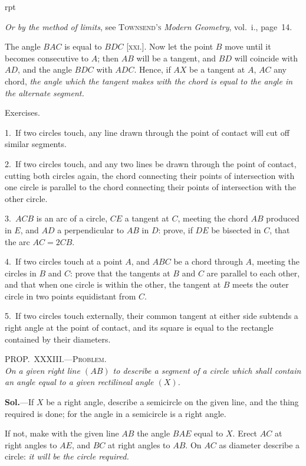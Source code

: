 \documentclass[oneside]{book}
\newcommand\myprop[2]{
\bigskip\Needspace*{4\baselineskip}\begin{center}\textsc{#1}\\\medskip\emph{#2}\par\end{center}
}
\newcommand\exhead[1]{
\Needspace*{5\baselineskip}\begin{center}
\textsf{#1}
\end{center}
}
\newcommand\imgflow[3]{
\setcounter{wrapwidth}{#1}
\begin{wrapfigure}[#2]{r}{\value{wrapwidth}pt}
\begin{center}
\vspace{-0.3in}
\end{center}
\end{wrapfigure}
}
\newcommand\imgcent[2]{
\begin{center}
\end{center}
}
\begin{document}
\imgflow{120}{9}{f140}

\textit{Or by the method of limits}, see \textsc{Townsend's} \emph{Modern
Geometry}, vol.~i., page~14.

The angle $BAC$ is equal to
$BDC$ [\textsc{xxi.}]. Now let the point
$B$ move until it becomes consecutive
to $A$; then $AB$ will be
a tangent, and $BD$ will coincide
with $AD$, and the angle $BDC$
with $ADC$. Hence, if $AX$ be
a tangent at $A$, $AC$ any chord,
\emph{the angle which the tangent makes with the chord is equal
to the angle in the alternate segment.}

\exhead{Exercises.}

\begin{footnotesize}
1.~If two circles touch, any line drawn through the point of
contact will cut off similar segments.

2.~If two circles touch, and any two lines be drawn through the
point of contact, cutting both circles again, the chord connecting
their points of intersection with one circle is parallel to the chord
connecting their points of intersection with the other circle.

3.~$ACB$ is an arc of a circle, $CE$ a tangent at $C$, meeting the
chord $AB$ produced in $E$, and $AD$ a perpendicular to $AB$ in $D$:
prove, if $DE$ be bisected in $C$, that the arc $AC = 2CB$.

4.~If two circles touch at a point $A$, and $ABC$ be a chord
through $A$, meeting the circles in $B$ and $C$: prove that the tangents
at $B$ and $C$ are parallel to each other, and that when one
circle is within the other, the tangent at $B$ meets the outer circle
in two points equidistant from $C$.

5.~If two circles touch externally, their common tangent at
either side subtends a right angle at the point of contact, and its
square is equal to the rectangle contained by their diameters.
\par\end{footnotesize}

\myprop{PROP\@.~XXXIII\@.---Problem.}{On a given right line $(AB)$ to describe a segment of a
circle which shall contain an angle equal to a given rectilineal
angle $(X)$.}

\textbf{Sol.}---If $X$ be a right angle, describe a semicircle on
the given line, and the thing required is done; for the
angle in a semicircle is a right angle.

\imgcent{290}{f141}

If not, make with the given line $AB$ the angle $BAE$
equal to $X$. Erect $AC$ at right angles to $AE$, and $BC$
at right angles to $AB$. On $AC$ as diameter describe a
circle: \emph{it will be the circle required.}
\end{document}
